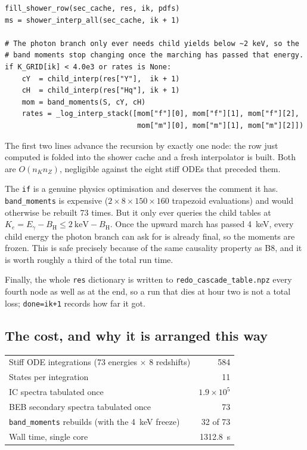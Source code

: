 \documentclass[11pt,a4paper]{article}
\newcommand{\code}[1]{\texttt{\small #1}}
\newcommand{\file}[1]{\texttt{\small #1}}
\newcommand{\Eg}{E_\gamma}
\newcommand{\BH}{B_{\mathrm{H}}}
\begin{document}
\begin{lstlisting}
fill_shower_row(sec_cache, res, ik, pdfs)
ms = shower_interp_all(sec_cache, ik + 1)

# The photon branch only ever needs child yields below ~2 keV, so the
# band moments stop changing once the marching has passed that energy.
if K_GRID[ik] < 4.0e3 or rates is None:
    cY  = child_interp(res["Y"],  ik + 1)
    cH  = child_interp(res["Hq"], ik + 1)
    mom = band_moments(S, cY, cH)
    rates = _log_interp_stack([mom["f"][0], mom["f"][1], mom["f"][2],
                               mom["m"][0], mom["m"][1], mom["m"][2]])
\end{lstlisting}

The first two lines advance the recursion by exactly one node: the row just
computed is folded into the shower cache and a fresh interpolator is built.
Both are $O(n_K n_Z)$, negligible against the eight stiff ODEs that preceded
them.

The \code{if} is a genuine physics optimisation and deserves the comment it
has.  \code{band\_moments} is expensive ($2\times8\times150\times160$ trapezoid
evaluations) and would otherwise be rebuilt 73 times.  But it only ever queries
the child tables at $K_e = \Eg - \BH \le 2\ \mathrm{keV} - \BH$.  Once the
upward march has passed 4~keV, every child energy the photon branch can ask for
is already final, so the moments are frozen.  This is safe precisely because of
the same causality property as B8, and it is worth roughly a third of the total
run time.

Finally, the whole \code{res} dictionary is written to
\file{redo\_cascade\_table.npz} every fourth node as well as at the end, so a
run that dies at hour two is not a total loss; \code{done=ik+1} records how far
it got.

\subsection{The cost, and why it is arranged this way}

\begin{center}
\begin{tabular}{lr}
\toprule
Stiff ODE integrations (73 energies $\times$ 8 redshifts) & 584 \\
States per integration                                    & 11 \\
IC spectra tabulated once                                 & $1.9\times10^{5}$ \\
BEB secondary spectra tabulated once                      & 73 \\
\code{band\_moments} rebuilds (with the 4~keV freeze)      & 32 of 73 \\
Wall time, single core                                    & 1312.8~s \\
\bottomrule
\end{tabular}
\end{center}
\end{document}
